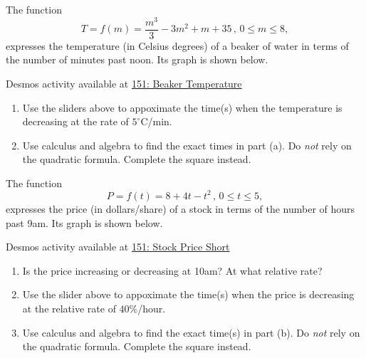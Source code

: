 \documentclass{ximera}
\begin{document}
\begin{question} \label{QLKDFeedddede}

The function 
\[
  T = f(m) = \frac{m^{3}}{3}-3m^{2}+m+35 \, , \, 0\leq m \leq 8 ,
\]
expresses the temperature (in Celsius degrees) of a beaker of water in terms of the number of minutes past noon. Its graph is shown below.

\begin{onlineOnly}
    \begin{center}
\end{center}
\end{onlineOnly}

Desmos activity available at
\href{https://www.desmos.com/calculator/jrzsv06pwt}{151: Beaker Temperature}

\begin{enumerate}
\item Use the sliders above to appoximate the time(s) when the temperature is decreasing at the rate of $5^\circ$C/min.

\item Use calculus and algebra to find the exact times in part (a). Do \emph{not} rely on the quadratic formula. Complete the square instead.
\end{enumerate}
\end{question}


\begin{question} \label{Q9efrlerdsfsf}
The function
\[
     P = f(t) = 8+4t-t^2 \, , \, 0\leq t \leq 5 ,
\]
expresses the price (in dollars/share) of a stock in terms of the number of hours past 9am. Its graph is shown below.

\begin{onlineOnly}
    \begin{center}
\end{center}
\end{onlineOnly}

Desmos activity available at
\href{https://www.desmos.com/calculator/jrwe6t0x41}{151: Stock Price Short}

\begin{enumerate}
\item Is the price increasing or decreasing at 10am? At what relative rate? 

\item Use the slider above to appoximate the time(s) when the price is decreasing at the relative rate of $40\%$/hour.

\item Use calculus and algebra to find the exact time(s) in part (b). Do \emph{not} rely on the quadratic formula. Complete the square instead.
\end{enumerate}
\end{question}
\end{document}
